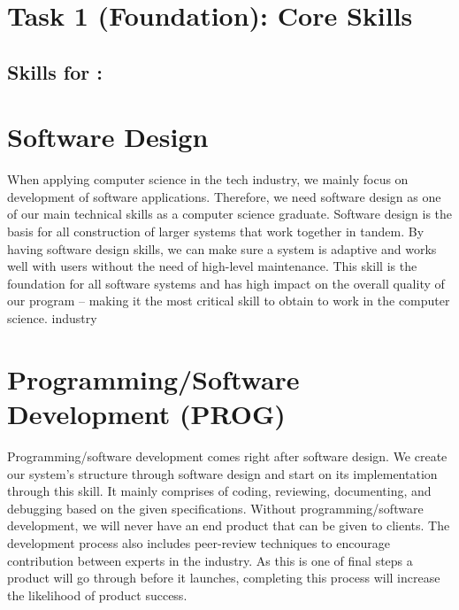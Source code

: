 \documentclass[a4paper, 11pt]{report}
\begin{document}

\tableofcontents


\newpage

\section{Task 1 (Foundation): Core Skills}

\subsection{Skills for \majA: \studA}


\section*{\textbf{Software Design}}
When applying computer science in the tech industry, we mainly focus on development of software applications. Therefore, we need software design as one of our main technical skills as a computer science graduate. Software design is the basis for all construction of larger systems that work together in tandem. By having software design skills, we can make sure a system is adaptive and works well with users without the need of high-level maintenance. This skill is the foundation for all software systems and has high impact on the overall quality of our program – making it the most critical skill to obtain to work in the computer science. industry\\

\section*{\textbf{Programming/Software Development (PROG)}}
Programming/software development comes right after software design. We create our system’s structure through software design and start on its implementation through this skill. It mainly comprises of coding, reviewing, documenting, and debugging based on the given specifications. Without programming/software development, we will never have an end product that can be given to clients. The development process also includes peer-review techniques to encourage contribution between experts in the industry. As this is one of final steps a product will go through before it launches, completing this process will increase the likelihood of product success.\\
\end{document}
